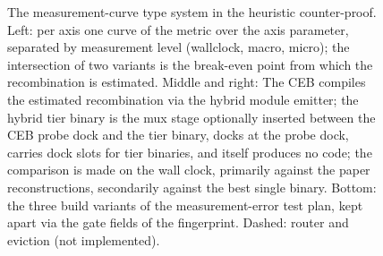 \begin{nurlang}
\begin{figure}[htbp]
\caption{The measurement-curve type system in the heuristic counter-proof. Left: per axis one curve
of the metric over the axis parameter, separated by measurement level (wallclock, macro, micro); the
intersection of two variants is the break-even point from which the recombination is estimated.
Middle and right: The CEB compiles the estimated recombination via the hybrid module emitter; the
hybrid tier binary is the mux stage optionally inserted between the CEB probe dock and the tier binary,
docks at the probe dock, carries dock slots for tier binaries, and itself produces no code; the
comparison is made on the wall clock, primarily against the paper reconstructions,
secondarily against the best single binary. Bottom: the three build variants of the
measurement-error test plan, kept apart via the gate fields of the fingerprint. Dashed: router and
eviction (not implemented).}\label{fig:eval-messkurven}
\end{figure}
\end{nurlang}
